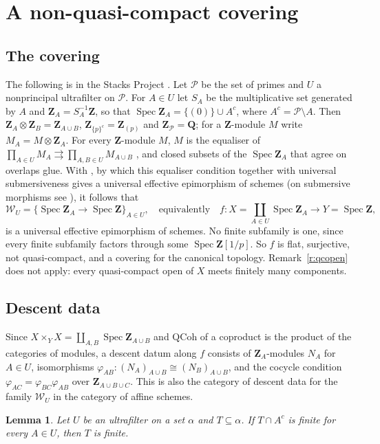 \documentclass[11pt,a4paper]{amsart}
\newtheorem{lemma}[theorem]{Lemma}
\theoremstyle{definition}
\theoremstyle{remark}
\newcommand{\Z}{\mathbf Z}
\newcommand{\Q}{\mathbf Q}
\newcommand{\Pp}{\mathcal P}
\newcommand{\QCoh}{\mathrm{QCoh}}
\newcommand{\Spec}{\operatorname{Spec}}
\begin{document}
\section{A non-quasi-compact covering}\label{sec:nqc}

\subsection{The covering}
The following is in the Stacks Project \cite[0EUE]{stacks}. Let $\Pp$ be the set of primes and $U$ a nonprincipal ultrafilter on $\Pp$. For $A\in U$ let $S_A$ be the multiplicative set generated by $A$ and $\Z_A=S_A^{-1}\Z$, so that $\Spec\Z_A=\{(0)\}\cup A^c$, where $A^c=\Pp\setminus A$. Then $\Z_A\otimes\Z_B=\Z_{A\cup B}$, $\Z_{\{p\}^c}=\Z_{(p)}$ and $\Z_\Pp=\Q$; for a $\Z$-module $M$ write $M_A=M\otimes\Z_A$. For every $\Z$-module $M$, $M$ is the equaliser of $\prod_{A\in U}M_A\rightrightarrows\prod_{A,B\in U}M_{A\cup B}$ \cite[0EUF]{stacks}, and closed subsets of the $\Spec\Z_A$ that agree on overlaps glue. With \cite[0EUD]{stacks}, by which this equaliser condition together with universal submersiveness gives a universal effective epimorphism of schemes (on submersive morphisms see \cite[\S1]{rydh}), it follows \cite[0EUG]{stacks} that
\[
\mathcal W_U=\{\Spec\Z_A\to\Spec\Z\}_{A\in U},\quad\text{equivalently}\quad f\colon X=\coprod_{A\in U}\Spec\Z_A\to Y=\Spec\Z,
\]
is a universal effective epimorphism of schemes. No finite subfamily is one, since every finite subfamily factors through some $\Spec\Z[1/p]$. So $f$ is flat, surjective, not quasi-compact, and a covering for the canonical topology. Remark~\ref{r:qcopen} does not apply: every quasi-compact open of $X$ meets finitely many components.

\subsection{Descent data}
Since $X\times_YX=\coprod_{A,B}\Spec\Z_{A\cup B}$ and $\QCoh$ of a coproduct is the product of the categories of modules, a descent datum along $f$ consists of $\Z_A$-modules $N_A$ for $A\in U$, isomorphisms $\varphi_{AB}\colon(N_A)_{A\cup B}\cong(N_B)_{A\cup B}$, and the cocycle condition $\varphi_{AC}=\varphi_{BC}\varphi_{AB}$ over $\Z_{A\cup B\cup C}$. This is also the category of descent data for the family $\mathcal W_U$ in the category of affine schemes.

\begin{lemma}\label{l:split}
Let $U$ be an ultrafilter on a set $\alpha$ and $T\subseteq\alpha$. If $T\cap A^c$ is finite for every $A\in U$, then $T$ is finite.
\end{lemma}
\end{document}
